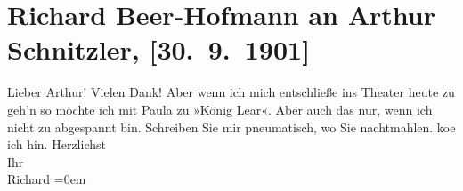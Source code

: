 

         
         \newcommand{\erwaehntePersonen}{Personen: Paula Beer-Hofmann}
         \newcommand{\erwaehnteInstitutionen}{}
         \newcommand{\erwaehnteOrte}{Orte: Wien}
         \newcommand{\erwaehnteWerke}{Werke: König Lear}
               \section[Richard Beer-Hofmann an Arthur Schnitzler, {[}30. 9. 1901{]}]{ Richard Beer-Hofmann an Arthur Schnitzler,
               {[}30. 9. 1901{]}}\nopagebreak{}\rehead{ }\begin{ledgroupsized}[t]{13cm}\normalsize\beginnumbering \toendnotes[C]{\smallbreak\pagebreak[2]} 
\toendnotes[C]{\smallbreak}\pstart
           \noindent{}{\pb}Lieber Arthur! Vielen Dank! Aber wenn ich mich entschließe ins
               Theater heute zu geh’n so möchte ich mit Paula zu
                  »König Lear«. Aber auch das nur, wenn ich nicht
               zu abgespannt bin. Schreiben Sie mir pneumatisch, wo Sie nachtmahlen.  ko{\geminationm}e ich hin.\pend
           \pstart
           Herzlichst{\\[\baselineskip]}Ihr{\\[\baselineskip]}\spacefill\mbox{Richard}\pend
           \leftskip=0em{}
         
         \endnumbering{}\end{ledgroupsized}  \newcommand{\dateiname}{L01177}\newcommand{\titel}{Richard Beer-Hofmann an Arthur Schnitzler, [30. 9. 1901]}\newcommand{\editorInnen}{Martin Anton Müller und Gerd-Hermann Susen}
      